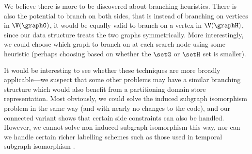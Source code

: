 We believe there is more to be discovered about branching heuristics. There is
also the potential to branch on both sides, that is instead of branching on
vertices in $\V(\graphG)$, it would be equally valid to branch on a vertex in
$\V(\graphH)$, since our data structure treats the two graphs symmetrically. More
interestingly, we could choose which graph to branch on at each search node
using some heuristic (perhaps choosing based on whether the $\setG$ or $\setH$ set is
smaller).

It would be interesting to see whether these techniques are more broadly
applicable---we suspect that some other problems may have a similar branching
structure which would also benefit from a partitioning domain store
representation. Most obviously, we could solve the induced subgraph isomorphism
problem in the same way (and with nearly no changes to the code), and our
connected variant shows that certain side constraints can also be handled.
However, we cannot solve non-induced subgraph isomorphism this way, nor can
we handle certain richer labelling schemes such as those used in temporal
subgraph isomorphism \citep{DBLP:conf/asunam/RedmondC13}.
